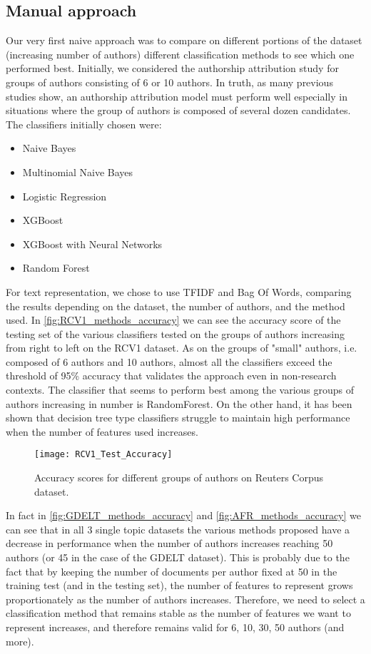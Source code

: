 \subsection{Manual approach}
Our very first naive approach was to compare on different portions of the dataset (increasing number of authors) different classification methods to see which one performed best.
Initially, we considered the authorship attribution study for groups of authors consisting of 6 or 10 authors. In truth, as many previous studies show, an authorship attribution model must perform well especially in situations where the group of authors is composed of several dozen candidates.
The classifiers initially chosen were:
\begin{itemize}
	\item Naive Bayes
	\item Multinomial Naive Bayes
	\item Logistic Regression
	\item XGBoost
	\item XGBoost with Neural Networks
	\item Random Forest
\end{itemize}
For text representation, we chose to use TFIDF and Bag Of Words, comparing the results depending on the dataset, the number of authors, and the method used.
In \autoref{fig:RCV1_methods_accuracy} we can see the accuracy score of the testing set of the various classifiers tested on the groups of authors increasing from right to left on the RCV1 dataset.
As on the groups of "small" authors, i.e. composed of 6 authors and 10 authors, almost all the classifiers exceed the threshold of 95\% accuracy that validates the approach even in non-research contexts. The classifier that seems to perform best among the various groups of authors increasing in number is RandomForest. On the other hand, it has been shown that decision tree type classifiers struggle to maintain high performance when the number of features used increases.

\begin{figure}[ht]
	\centering
	\texttt{[image: RCV1\_Test\_Accuracy]}
	\caption[Methods performance on Reuters Corpus]{Accuracy scores for different groups of authors on Reuters Corpus dataset.}
	\label{fig:RCV1_methods_accuracy}
\end{figure}

In fact in \autoref{fig:GDELT_methods_accuracy} and \ref{fig:AFR_methods_accuracy} we can see that in all 3 single topic datasets the various methods proposed have a decrease in performance when the number of authors increases reaching 50 authors (or 45 in the case of the GDELT dataset).
This is probably due to the fact that by keeping the number of documents per author fixed at 50 in the training test (and in the testing set), the number of features to represent grows proportionately as the number of authors increases. Therefore, we need to select a classification method that remains stable as the number of features we want to represent increases, and therefore remains valid for 6, 10, 30, 50 authors (and more).

